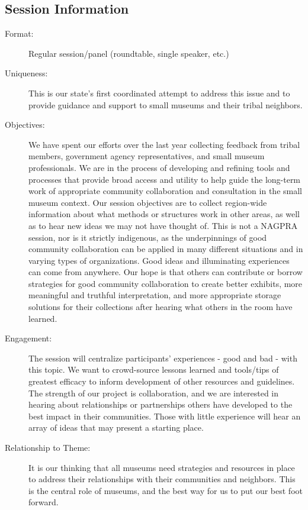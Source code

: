 \documentclass{report}
\begin{document}
              \subsection*{Session Information}
                \begin{description}
                  \item [Format:] Regular session/panel (roundtable, single speaker, etc.)
							    
							    \item [Uniqueness:]This is our state’s first coordinated attempt to address this issue and to provide guidance and support to small museums and their tribal neighbors.
							    \item [Objectives:]We have spent our efforts over the last year collecting feedback from tribal members, government agency representatives, and small museum professionals. We are in the process of developing and refining tools and processes that provide broad access and utility to help guide the long-term work of appropriate community collaboration and consultation in the small museum context. Our session objectives are to collect region-wide information about what methods or structures work in other areas, as well as to hear new ideas we may not have thought of. This is not a NAGPRA session, nor is it strictly indigenous, as the underpinnings of good community collaboration can be applied in many different situations and in varying types of organizations. Good ideas and illuminating experiences can come from anywhere. Our hope is that others can contribute or borrow strategies for good community collaboration to create better exhibits, more meaningful and truthful interpretation, and more appropriate storage solutions for their collections after hearing what others in the room have learned.
							    \item [Engagement:]The session will centralize participants' experiences - good and bad - with this topic. We want to crowd-source lessons learned and tools/tips of greatest efficacy to inform development of other resources and guidelines. The strength of our project is collaboration, and we are interested in hearing about relationships or partnerships others have developed to the best impact in their communities. Those with little experience will hear an array of ideas that may present a starting place.
							    \item [Relationship to Theme:]It is our thinking that all museums need strategies and resources in place to address their relationships with their communities and neighbors. This is the central role of museums, and the best way for us to put our best foot forward.
							    
                \end{description}
\end{document}
